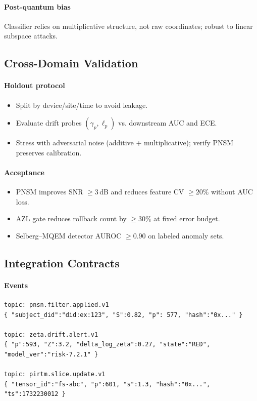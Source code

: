 \documentclass[11pt]{article}
\theoremstyle{plain}
\begin{document}
\paragraph{Post-quantum bias}
Classifier relies on multiplicative structure, not raw coordinates; robust to linear subspace attacks.

\subsection{Cross-Domain Validation}
\paragraph{Holdout protocol}
\begin{itemize}
  \item Split by device/site/time to avoid leakage.
  \item Evaluate drift probes $(\gamma_p,\ell_p)$ vs. downstream AUC and ECE.
  \item Stress with adversarial noise (additive + multiplicative); verify PNSM preserves calibration.
\end{itemize}
\paragraph{Acceptance}
\begin{itemize}
  \item PNSM improves SNR $\ge 3$\,dB and reduces feature CV $\ge 20\%$ without AUC loss.
  \item AZL gate reduces rollback count by $\ge 30\%$ at fixed error budget.
  \item Selberg--MQEM detector AUROC $\ge 0.90$ on labeled anomaly sets.
\end{itemize}

\subsection{Integration Contracts}
\paragraph{Events}
\begin{verbatim}
topic: pnsn.filter.applied.v1
{ "subject_did":"did:ex:123", "S":0.82, "p": 577, "hash":"0x..." }

topic: zeta.drift.alert.v1
{ "p":593, "Z":3.2, "delta_log_zeta":0.27, "state":"RED", "model_ver":"risk-7.2.1" }

topic: pirtm.slice.update.v1
{ "tensor_id":"fs-abc", "p":601, "s":1.3, "hash":"0x...", "ts":1732230012 }
\end{verbatim}
\end{document}

